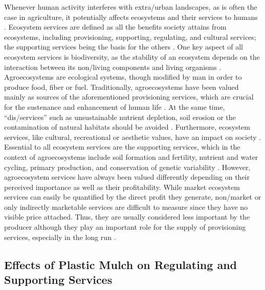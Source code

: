 Whenever human activity interferes with extra\-/urban landscapes, as is often the case in agriculture, it potentially affects ecosystems and their services to humans \citep{FoleyGlobal2005}. Ecosystem services are defined as all the benefits society attains from ecosystems, including provisioning, supporting, regulating, and cultural services; the supporting services being the basis for the others \citep{MillenniumEcosystemAssessmentEcosystems2005}. One key aspect of all ecosystem services is biodiversity, as the stability of an ecosystem depends on the interaction between its non\-/living components and living organisms \citep{Haines-YoungLinks2010}. Agroecosystems are ecological systems, though modified by man in order to produce food, fiber or fuel.
Traditionally, agroecosystems have been valued mainly as sources of the aforementioned provisioning services, which are crucial for the sustenance and enhancement of human life \citep{PowerEcosystem2010}. At the same time, ``dis\-/services'' such as unsustainable nutrient depletion, soil erosion or the contamination of natural habitats should be avoided \citep{ZhangEcosystem2007}. Furthermore, ecosystem services, like cultural, recreational or aesthetic values, have an impact on society \citep{UlrichHuman1986}. Essential to all ecosystem services are the supporting services, which in the context of agroecosystems include soil formation and fertility, nutrient and water cycling, primary production, and conservation of genetic variability \citep{MillenniumEcosystemAssessmentEcosystems2005}. However, agroecosystem services have always been valued differently depending on their perceived importance as well as their profitability. While market ecosystem services can easily be quantified by the direct profit they generate, non\-/market or only indirectly marketable services are difficult to measure since they have no visible price attached. Thus, they are usually considered less important by the producer although they play an important role for the supply of provisioning services, especially in the long run \citep{SwintonEcosystem2007}.

\subsection{Effects of Plastic Mulch on Regulating and Supporting Services}

